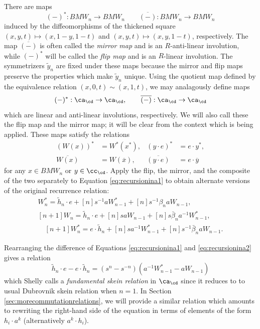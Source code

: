 There are maps
\[
	(-)^*: BMW_n \to BMW_n \qquad \overline{(-)}: BMW_n \to BMW_n
\]
induced by the diffeomorphisms of the thickened square $(x, y, t) \mapsto (x, 1-y, 1-t)$ and $(x, y, t) \mapsto (x, y, 1-t)$, respectively. The map $\overline{(-)}$ is often called the \emph{mirror map} and is an $R$-anti-linear involution, while $(-)^*$ will be called the \emph{flip map} and is an $R$-linear involution. The symmetrizers $\tilde{y}_n$ are fixed under these maps because the mirror and flip maps preserve the properties which make $\tilde{y}_n$ unique.
Using the quotient map defined by the equivalence relation $(x, 0, t) \sim (x, 1, t)$, we may analagously define maps
\[
	(-)^*: \ca_\cd \to \ca_\cd, \qquad \overline{(-)}: \ca_\cd \to \ca_\cd
\]
which are linear and anti-linear involutions, respectively. We will also call these the flip map and the mirror map; it will be clear from the context which is being applied. These maps satisfy the relations
\begin{align*}
	\left( W \left( x \right) \right)^* &= W^* \left( x^* \right), & (y \cdot e)^* &= e \cdot y^*, \\
	\overline{W \left( x \right)} &= W \left( \overline{x} \right), & \overline{(y \cdot e)} &= e \cdot \overline{y}
\end{align*}
for any $x \in BMW_n$ or $y \in \cc_\cd$. Apply the flip, the mirror, and the composite of the two separately to Equation \eqref{eq:recursionina1} to obtain alternate versions of the original recurrence relation:
\begin{align} 
[n+1] W^*_n = \tilde{h}_n \cdot e + [n] s^{-1} a W^*_{n-1} + [n] s^{-1} \beta_n a W_{n-1} \label{eq:recursionina2}, \\
[n+1] W_n = \tilde{h}_n \cdot e + [n] s a W_{n-1} + [n] s \bar{\beta}_n a^{-1} W^*_{n-1} \label{eq:recursionina3}, \\
\quad [n+1] W^*_n = e \cdot \tilde{h}_n + [n] s a^{-1} W^*_{n-1} + [n] s^{-1} \bar{\beta}_n a W_{n-1}. \label{eq:recursionina4}
\end{align}

Rearranging the difference of Equations \eqref{eq:recursionina1} and \eqref{eq:recursionina2} gives a relation
\begin{equation} \label{eq:annfund}
\tilde{h}_n \cdot e - e \cdot \tilde{h}_n = (s^n - s^{-n}) (a^{-1} W^*_{n-1} - a W_{n-1})
\end{equation}
which Shelly calls a \textit{fundamental skein relation} in $\ca_\cd$ since it reduces to to usual Dubrovnik skein relation when $n=1$.  In Section \ref{sec:morecommutationrelations}, we will provide a similar relation which amounts to rewriting the right-hand side of the equation in terms of elements of the form $h_i \cdot a^k$ (alternatively $a^k \cdot h_i$). 




